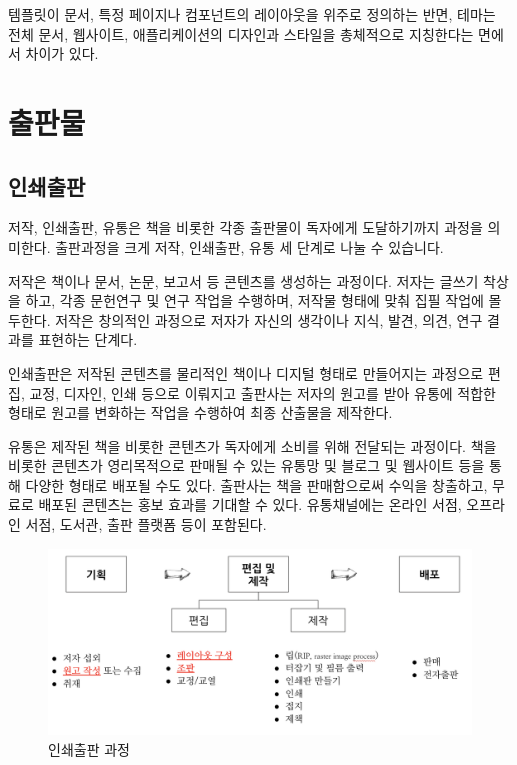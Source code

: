 \documentclass[
  letterpaper,
]{book}
\begin{document}
템플릿이 문서, 특정 페이지나 컴포넌트의 레이아웃을 위주로 정의하는 반면,
테마는 전체 문서, 웹사이트, 애플리케이션의 디자인과 스타일을 총체적으로
지칭한다는 면에서 차이가 있다.

\part{출판물}

\hypertarget{uxc778uxc1c4uxcd9cuxd310}{%
\chapter{인쇄출판}\label{uxc778uxc1c4uxcd9cuxd310}}

저작, 인쇄출판, 유통은 책을 비롯한 각종 출판물이 독자에게 도달하기까지
과정을 의미한다. 출판과정을 크게 저작, 인쇄출판, 유통 세 단계로 나눌 수
있습니다.

저작은 책이나 문서, 논문, 보고서 등 콘텐츠를 생성하는 과정이다. 저자는
글쓰기 착상을 하고, 각종 문헌연구 및 연구 작업을 수행하며, 저작물 형태에
맞춰 집필 작업에 몰두한다. 저작은 창의적인 과정으로 저자가 자신의
생각이나 지식, 발견, 의견, 연구 결과를 표현하는 단계다.

인쇄출판은 저작된 콘텐츠를 물리적인 책이나 디지털 형태로 만들어지는
과정으로 편집, 교정, 디자인, 인쇄 등으로 이뤄지고 출판사는 저자의 원고를
받아 유통에 적합한 형태로 원고를 변화하는 작업을 수행하여 최종 산출물을
제작한다.

유통은 제작된 책을 비롯한 콘텐츠가 독자에게 소비를 위해 전달되는
과정이다. 책을 비롯한 콘텐츠가 영리목적으로 판매될 수 있는 유통망 및
블로그 및 웹사이트 등을 통해 다양한 형태로 배포될 수도 있다. 출판사는
책을 판매함으로써 수익을 창출하고, 무료로 배포된 콘텐츠는 홍보 효과를
기대할 수 있다. 유통채널에는 온라인 서점, 오프라인 서점, 도서관, 출판
플랫폼 등이 포함된다.

\begin{figure}

{\centering \includegraphics{images/pdf-workflow.png}

}

\caption{인쇄출판 과정}

\end{figure}
\end{document}
